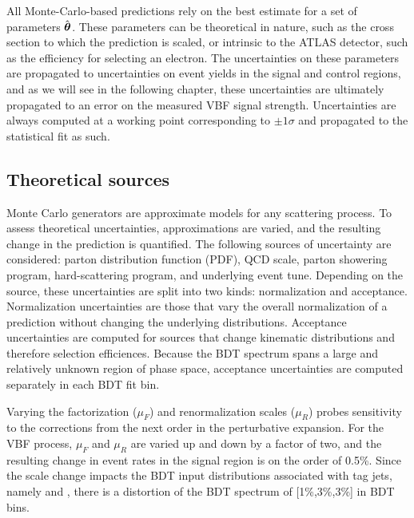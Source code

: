 All Monte-Carlo-based predictions rely on the best estimate for a set
of parameters $\hat{\boldsymbol{\theta}}$. These parameters can be
theoretical in nature, such as the cross section to which the
prediction is scaled, or intrinsic to the ATLAS detector, such as the
efficiency for selecting an electron. The uncertainties on these
parameters are propagated to uncertainties on event yields in the
signal and control regions, and as we will see in the following
chapter, these uncertainties are ultimately propagated to an error on
the measured VBF signal strength. Uncertainties are always computed at a
working point corresponding to $\pm 1\sigma$ and propagated to the
statistical fit as such.

\subsection{Theoretical sources}

Monte Carlo generators are approximate models for any scattering
process. To assess theoretical uncertainties, approximations are
varied, and the resulting change in the prediction is
quantified. The following sources of uncertainty are considered:
parton distribution function (PDF), QCD scale, parton showering
program, hard-scattering program, and underlying event tune. Depending
on the source, these uncertainties are split into two kinds:
normalization and acceptance. Normalization uncertainties are those
that vary the overall normalization of a prediction without changing
the underlying distributions. Acceptance uncertainties are computed
for sources that change kinematic distributions and therefore
selection efficiences. Because the BDT spectrum spans a large and
relatively unknown region of phase space, acceptance uncertainties are
computed separately in each BDT fit bin.

Varying the factorization ($\mu_F$) and renormalization scales
($\mu_R$) probes sensitivity to the corrections from the next order in
the perturbative expansion. For the VBF process, $\mu_F$ and $\mu_R$
are varied up and down by a factor of two, and the resulting change in
event rates in the signal region is on the order of 0.5\%. Since the
scale change impacts the BDT input distributions associated with tag
jets, namely \mjj and \dyjj, there is a distortion of the BDT
spectrum of [1\%,3\%,3\%] in BDT bins. 

